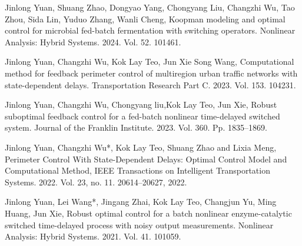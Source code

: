 \documentclass[12pt]{llncs}
\begin{document}
%



\begin{thebibliography}{9} %

 Jinlong Yuan, Shuang Zhao, Dongyao Yang, Chongyang Liu, Changzhi Wu, Tao Zhou, Sida Lin, Yuduo Zhang, Wanli Cheng, Koopman modeling and optimal control for microbial fed-batch fermentation with switching operators. Nonlinear Analysis: Hybrid Systems.  2024. Vol. 52. 101461.

 Jinlong Yuan, Changzhi Wu, Kok Lay Teo, Jun Xie Song Wang, Computational method for feedback perimeter control of multiregion urban traffic networks with state-dependent delays. Transportation Research Part C. 2023. Vol. 153. 104231.

 Jinlong Yuan, Changzhi Wu, Chongyang liu,Kok Lay Teo, Jun Xie, Robust suboptimal feedback control for a fed-batch nonlinear time-delayed switched system. Journal of the Franklin Institute. 2023. Vol. 360. Pp. 1835--1869.

 Jinlong Yuan, Changzhi Wu*, Kok Lay Teo, Shuang Zhao and Lixia Meng, Perimeter Control With State-Dependent Delays: Optimal Control Model and Computational Method, IEEE Transactions on Intelligent Transportation Systems. 2022. Vol. 23, no. 11. 20614--20627, 2022.

 Jinlong Yuan, Lei Wang*, Jingang Zhai, Kok Lay Teo, Changjun Yu, Ming Huang, Jun Xie, Robust optimal control for a batch nonlinear enzyme-catalytic switched time-delayed process with noisy output measurements. Nonlinear Analysis: Hybrid Systems. 2021. Vol. 41. 101059.

\end{thebibliography}
\end{document}
